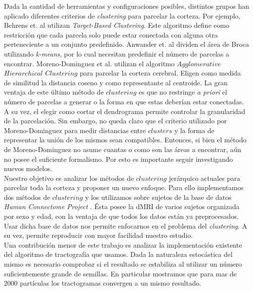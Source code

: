 Dada la cantidad de herramientas y configuraciones posibles, distintos
grupos han aplicado diferentes criterios de \textit{clustering} para
parcelar la corteza. Por ejemplo, Behrens et. al \cite{Behrens2003}
utilizan \textit{Target-Based Clustering}. Este algoritmo define como
restricci\'on que cada parcela solo puede estar conectada con alguna otra
perteneciente a un conjunto predefinido. Anwander et. al 
\cite{Anwander2006} dividen el \'area de Broca utilizando 
\textit{k-means}, por lo cual necesitan predefinir el n\'umero de parcelas
a encontrar. Moreno-Dominguez et al. \cite{Moreno-Dominguez2014} utilizan
el algoritmo $Agglomerative$ $Hierarchical$ $Clustering$ para parcelar la
corteza cerebral. Eligen como medida de similitud la distancia coseno y
como representante al centroide. La gran ventaja de este \'ultimo m\'etodo
de $clustering$ es que no restringe {\it a priori} el n\'umero de parcelas
a generar o la forma en que estas deber\'ian estar conectadas. A su vez,
el elegir como cortar el dendrograma permite controlar la granularidad de
la parcelaci\'on. Sin embargo, no queda claro que el criterio utilizado
por Moreno-Dominguez para medir distancias entre $clusters$ y la forma de
representar la uni\'on de los mismos sean compatibles. Entonces, si bien
el m\'etodo de Moreno-Dominguez no asume cuantas o como son las \'areas a
encontrar, a\'un no posee el suficiente formalismo. Por esto es importante
seguir investigando nuevos modelos.  \\

Nuestro objetivo es analizar los m\'etodos de $clustering$ jer\'arquico
actuales para parcelar toda la corteza y proponer un nuevo
enfoque. Para ello implementamos dos m\'etodos de $clustering$ y los 
utilizamos sobre sujetos de la base de datos \textit{Human Connectome
Project} \cite{VanEssen2012}. \'Esta posee la dMRI de varios sujetos
organizada por sexo y edad, con la ventaja de que todos los datos est\'an
ya preprocesados. Usar dicha base de datos nos permite enfocarnos en el
problema del \textit{clustering}. A su vez, permite reproducir con mayor
facilidad nuestro estudio. \\

Una contribuci\'on menor de este trabajo es analizar la implementaci\'on 
existente del algoritmo de tractograf\'ia que usamos. Dada la naturaleza
estoc\'astica del mismo es necesario comprobar si el resultado se
estabiliza al utilizar un n\'umero suficientemente grande de semillas. En
particular mostramos que para mas de $2000$ part\'iculas los tractogramas
convergen a un mismo resultado. \\

